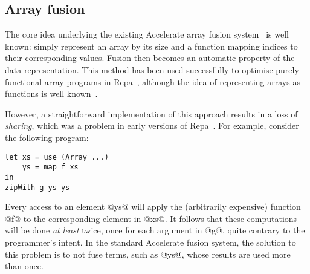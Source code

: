 \subsection{Array fusion}

The core idea underlying the existing Accelerate array fusion system~\cite{McDonell:acc-optim} is well known: simply represent an array by its size and a function mapping indices to their corresponding values. Fusion then becomes an automatic property of the data representation. This method has been used successfully to optimise purely functional array programs in
Repa~\cite{Keller:Repa,Lippmeier:Guiding}, although the idea of representing arrays as functions is well known~\cite{Claessen:obsidian-expressive,Guibas:1978jh,Elliott:2003ug}.



However, a straightforward implementation of this approach results in a loss of \emph{sharing}, which was a problem in early versions of Repa~\cite{Lippmeier:Guiding}. For example, consider the following program:
%
\begin{lstlisting}
let xs = use (Array ...)
    ys = map f xs
in
zipWith g ys ys
\end{lstlisting}
%
Every access to an element @ys@ will apply the (arbitrarily expensive) function @f@ to the corresponding element in @xs@. It follows that these computations will be done \emph{at least} twice, once for each argument in @g@, quite contrary to the programmer's intent. In the standard Accelerate fusion system, the solution to this problem is to not fuse terms, such as @ys@, whose results are used more than once.


